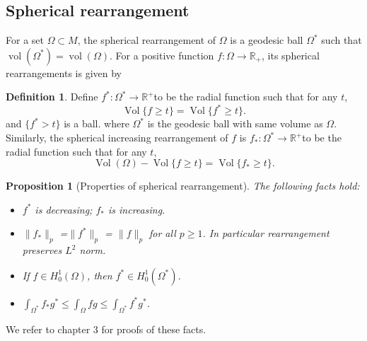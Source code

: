 \documentclass{amsart}
\numberwithin{equation}{section}
\theoremstyle{plain}
\newtheorem{prop}[theorem]{Proposition}
\theoremstyle{definition}
\newtheorem{definition}[theorem]{Definition}
\theoremstyle{remark}
\def\RR {\mathbb{R}}
\begin{document}
\subsection{Spherical rearrangement}
For a set $\Omega\subset M$, the spherical rearrangement of $\Omega$ is a geodesic ball $\Omega^*$ such that $\operatorname{vol}(\Omega^*)=\operatorname{vol}(\Omega)$. For a positive function $f:\Omega \to \RR_+$, its spherical rearrangements is given by \cite[Definition 2.0.1]{edelen2017ppw}
\begin{definition}
        Define $f^*: \Omega^* \rightarrow \mathbb{R}^{+}$to be the radial function such that for any $t$,
$$
\operatorname{Vol}\{f \geq t\}=\operatorname{Vol}\{f^* \geq t\} .
$$
and $\{f^*>t\}$ is a ball.
where $\Omega^*$ is the geodesic ball with same volume as $\Omega$. Similarly, the spherical increasing rearrangement of $f$ is $f_*: \Omega^* \rightarrow \mathbb{R}^{+}$to be the radial function such that for any $t$,
$$
\operatorname{Vol}(\Omega)- \operatorname{Vol}\{f \geq t\}=\operatorname{Vol}\{f_* \geq t\} .
$$
\end{definition}
\begin{prop}[Properties of spherical rearrangement]
The following facts hold:
    \begin{itemize}
        \item $f^*$ is decreasing; $f_*$ is increasing.
        \item  $\|f_*\|_p$ =$\|f^*\|_p$ = $\|f\|_p$ for all $p\geq1$. In particular rearrangement preserves $L^2$ norm.
        \item If $f\in H_0^1 (\Omega)$, then $f^*\in H_0^1 (\Omega^*) $.
        \item $\int_{\Omega^*} f_*g^* \leq \int_{\Omega} fg \leq \int_{\Omega^*} f^*g^*$.
    \end{itemize}
\end{prop}
We refer to \cite{lieb2001analysis} chapter 3 for proofs of these facts.
\end{document}
